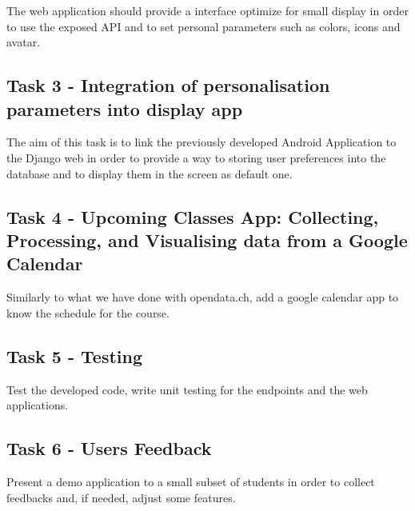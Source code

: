 \documentclass[11pt]{report}
\begin{document}
The web application should provide a interface optimize for small display in order to use the exposed API and to set personal parameters such as colors, icons and avatar.

\subsection*{Task 3 - Integration of personalisation parameters into display app}
The aim of this task is to link the previously developed Android Application to the Django web in order to provide a way to storing user preferences into the database and to display them in the screen as default one.
\subsection*{Task 4 - Upcoming Classes App: Collecting, Processing, and Visualising data from a Google Calendar}
Similarly to what we have done with opendata.ch, add a google calendar app to know the schedule for the course.

\subsection*{Task 5 - Testing}
Test the developed code, write unit testing for the endpoints and the web applications.
\subsection*{Task 6 - Users Feedback}
Present a demo application to a small subset of students in order to collect feedbacks and, if needed, adjust some features.
\end{document}
